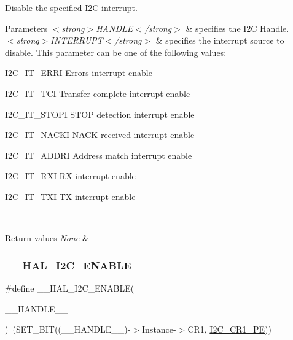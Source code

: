 Disable the specified I2C interrupt. 


\begin{DoxyParams}{Parameters}
{\em $<$strong$>$\+H\+A\+N\+D\+L\+E$<$/strong$>$} & specifies the I2C Handle. \\
\hline
{\em $<$strong$>$\+I\+N\+T\+E\+R\+R\+U\+P\+T$<$/strong$>$} & specifies the interrupt source to disable. This parameter can be one of the following values\+: \begin{DoxyItemize}
\item I2\+C\+\_\+\+I\+T\+\_\+\+E\+R\+RI Errors interrupt enable \item I2\+C\+\_\+\+I\+T\+\_\+\+T\+CI Transfer complete interrupt enable \item I2\+C\+\_\+\+I\+T\+\_\+\+S\+T\+O\+PI S\+T\+OP detection interrupt enable \item I2\+C\+\_\+\+I\+T\+\_\+\+N\+A\+C\+KI N\+A\+CK received interrupt enable \item I2\+C\+\_\+\+I\+T\+\_\+\+A\+D\+D\+RI Address match interrupt enable \item I2\+C\+\_\+\+I\+T\+\_\+\+R\+XI RX interrupt enable \item I2\+C\+\_\+\+I\+T\+\_\+\+T\+XI TX interrupt enable\end{DoxyItemize}
\\
\hline
\end{DoxyParams}

\begin{DoxyRetVals}{Return values}
{\em None} & \\
\hline
\end{DoxyRetVals}
\mbox{\label{group___i2_c___exported___macros_gacff412c47b0c1d63ef3b2a07f65988b7}} 
\subsubsection{\texorpdfstring{\_\_HAL\_I2C\_ENABLE}{\_\_HAL\_I2C\_ENABLE}}
{\footnotesize\ttfamily \#define \+\_\+\+\_\+\+H\+A\+L\+\_\+\+I2\+C\+\_\+\+E\+N\+A\+B\+LE(\begin{DoxyParamCaption}\item[{}]{\+\_\+\+\_\+\+H\+A\+N\+D\+L\+E\+\_\+\+\_\+ }\end{DoxyParamCaption})~(S\+E\+T\+\_\+\+B\+IT((\+\_\+\+\_\+\+H\+A\+N\+D\+L\+E\+\_\+\+\_\+)-\/$>$Instance-\/$>$C\+R1,  \mbox{\hyperlink{group___peripheral___registers___bits___definition_ga953b0d38414808db79da116842ed3262}{I2\+C\+\_\+\+C\+R1\+\_\+\+PE}}))}



